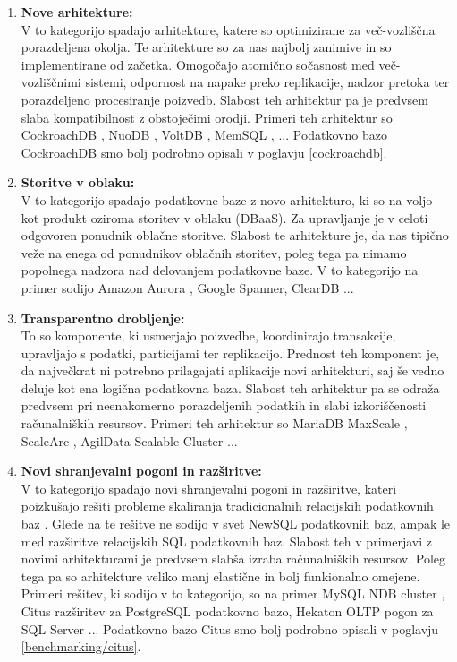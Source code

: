 \documentclass[a4paper, 12pt]{book}
\begin{document}
\begin{enumerate}
    \item \textbf{Nove arhitekture:}\\V to kategorijo spadajo arhitekture, katere so optimizirane za več-vozliščna porazdeljena okolja. Te arhitekture so za nas najbolj zanimive in so implementirane od začetka. Omogočajo atomično sočasnost med več-vozliščnimi sistemi, odpornost na napake preko replikacije, nadzor pretoka ter porazdeljeno procesiranje poizvedb. Slabost teh arhitektur pa je predvsem slaba kompatibilnost z obstoječimi orodji. Primeri teh arhitektur so CockroachDB \cite{cockroachdb/cockroach}, NuoDB \cite{nuodb-home}, VoltDB \cite{voltdb-home}, MemSQL \cite{memsql-home}, ... Podatkovno bazo CockroachDB smo bolj podrobno opisali v poglavju \ref{cockroachdb}.
    \item \textbf{Storitve v oblaku:}\\V to kategorijo spadajo podatkovne baze z novo arhitekturo, ki so na voljo kot produkt oziroma storitev v oblaku (DBaaS). Za upravljanje je v celoti odgovoren ponudnik oblačne storitve. Slabost te arhitekture je, da nas tipično veže na enega od ponudnikov oblačnih storitev, poleg tega pa nimamo popolnega nadzora nad delovanjem podatkovne baze. V to kategorijo na primer sodijo Amazon Aurora \cite{aurora-home}, Google Spanner\cite{spanner-home}, ClearDB \cite{cleardb-home} ...
    \item \textbf{Transparentno drobljenje:}\\To so komponente, ki usmerjajo poizvedbe, koordinirajo transakcije, upravljajo s podatki, particijami ter replikacijo. Prednost teh komponent je, da največkrat ni potrebno prilagajati aplikacije novi arhitekturi, saj še vedno deluje kot ena logična podatkovna baza. Slabost teh arhitektur pa se odraža predvsem pri neenakomerno porazdeljenih podatkih in slabi izkoriščenosti računalniških resursov. Primeri teh arhitektur so MariaDB MaxScale \cite{mariadb-maxscale-home}, ScaleArc \cite{scalearc-home}, AgilData Scalable Cluster \cite{agiledata-home} ...
    \item \textbf{Novi shranjevalni pogoni in razširitve:}\\V to kategorijo spadajo novi shranjevalni pogoni in razširitve, kateri poizkušajo rešiti probleme skaliranja tradicionalnih relacijskih podatkovnih baz \cite{Kumar2018Jun}. Glede na \cite{Pavlo2016Sep} te rešitve ne sodijo v svet NewSQL podatkovnih baz, ampak le med razširitve relacijskih SQL podatkovnih baz. Slabost teh v primerjavi z novimi arhitekturami je predvsem slabša izraba računalniških resursov. Poleg tega pa so arhitekture veliko manj elastične in bolj funkionalno omejene. Primeri rešitev, ki sodijo v to kategorijo, so na primer MySQL NDB cluster \cite{mysqlndbcluster-home}, Citus \cite{citus} razširitev za PostgreSQL podatkovno bazo, Hekaton \cite{hekaton-home} OLTP pogon za SQL Server ... Podatkovno bazo Citus smo bolj podrobno opisali v poglavju \ref{benchmarking/citus}.
\end{enumerate}
\end{document}
